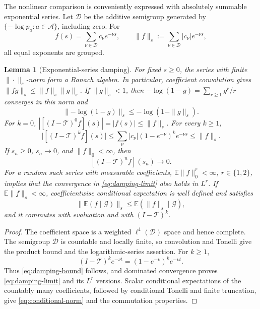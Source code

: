 \documentclass[journal]{IEEEtran}
\theoremstyle{plain}
\newtheorem{lemma}[theorem]{Lemma}
\theoremstyle{definition}
\theoremstyle{remark}
\newcommand{\A}{\mathcal A}
\begin{document}
The nonlinear comparison is conveniently expressed with absolutely summable exponential series.  Let $\mathcal D$ be the additive semigroup generated by $\{-\log p_a:a\in\A\}$, including zero.  For
\begin{equation*}
 f(s)=\sum_{\nu\in\mathcal D}c_\nu e^{-\nu s},
 \qquad
 \|f\|_s:=\sum_{\nu\in\mathcal D}|c_\nu|e^{-\nu s},
\end{equation*}
all equal exponents are grouped.

\begin{lemma}[Exponential-series damping]\label{lem:damping}
For fixed $s\ge0$, the series with finite $\|\cdot\|_s$-norm form a Banach algebra.  In particular, coefficient convolution gives $\|fg\|_s\le\|f\|_s\|g\|_s$.  If $\|g\|_s<1$, then $-\log(1-g)=\sum_{r\ge1}g^r/r$ converges in this norm and
\begin{equation*}
 \|{-\log(1-g)}\|_s\le-\log(1-\|g\|_s).
\end{equation*}
For $k=0$, $|[(I-\mathcal T)^0f](s)|=|f(s)|\le\|f\|_s$.  For every $k\ge1$,
\begin{equation}\label{eq:damping-bound}
 \bigl|[(I-\mathcal T)^kf](s)\bigr|
 \le\sum_\nu|c_\nu|(1-e^{-\nu})^ke^{-\nu s}
 \le\|f\|_s.
\end{equation}
If $s_n\ge0$, $s_n\to0$, and $\|f\|_0<\infty$, then
\begin{equation}\label{eq:damping-limit}
 [(I-\mathcal T)^nf](s_n)\longrightarrow0.
\end{equation}
For a random such series with measurable coefficients, $\mathbb E\|f\|_0^r<\infty$, $r\in\{1,2\}$, implies that the convergence in \eqref{eq:damping-limit} also holds in $L^r$.  If $\mathbb E\|f\|_s<\infty$, coefficientwise conditional expectation is well defined and satisfies
\begin{equation}\label{eq:conditional-norm}
 \bigl\|\mathbb E(f\mid\mathcal G)\bigr\|_s
 \le\mathbb E(\|f\|_s\mid\mathcal G),
\end{equation}
and it commutes with evaluation and with $(I-\mathcal T)^k$.
\end{lemma}

\begin{proof}
The coefficient space is a weighted $\ell^1(\mathcal D)$ space and hence complete.  The semigroup $\mathcal D$ is countable and locally finite, so convolution and Tonelli give the product bound and the logarithmic-series assertion.  For $k\ge1$,
\begin{equation*}
 (I-\mathcal T)^ke^{-\nu t}=(1-e^{-\nu})^ke^{-\nu t}.
\end{equation*}
Thus \eqref{eq:damping-bound} follows, and dominated convergence proves \eqref{eq:damping-limit} and its $L^r$ versions.  Scalar conditional expectations of the countably many coefficients, followed by conditional Tonelli and finite truncation, give \eqref{eq:conditional-norm} and the commutation properties.
\end{proof}
\end{document}

